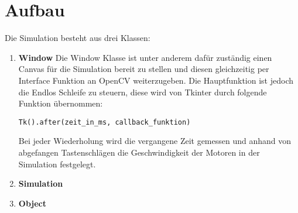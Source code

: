 \documentclass[12pt]{article}
\begin{document}
\section{Aufbau}
Die Simulation besteht aus drei Klassen:
\begin{enumerate} 
\item \textbf{Window}\newline
Die Window Klasse ist unter anderem dafür zuständig einen Canvas für die Simulation bereit zu stellen und diesen gleichzeitig per Interface Funktion an OpenCV weiterzugeben.
Die Hauptfunktion ist jedoch die Endlos Schleife zu steuern, diese wird von Tkinter durch folgende Funktion übernommen:
\begin{lstlisting}
Tk().after(zeit_in_ms, callback_funktion)
\end{lstlisting}
Bei jeder Wiederholung wird die vergangene Zeit gemessen und anhand von abgefangen Tastenschlägen die Geschwindigkeit der Motoren in der Simulation festgelegt.
\item \textbf{Simulation}\newline
\item \textbf{Object}\newline
\end{enumerate}
\end{document}
